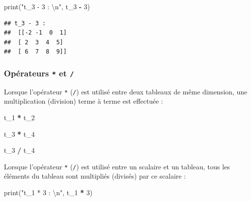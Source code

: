 \documentclass[12pt,]{book}
\newenvironment{Shaded}{\begin{snugshade}}{\end{snugshade}}
\newcommand{\DecValTok}[1]{\textcolor[rgb]{0.00,0.00,0.81}{#1}}
\newcommand{\CharTok}[1]{\textcolor[rgb]{0.31,0.60,0.02}{#1}}
\newcommand{\StringTok}[1]{\textcolor[rgb]{0.31,0.60,0.02}{#1}}
\newcommand{\OperatorTok}[1]{\textcolor[rgb]{0.81,0.36,0.00}{\textbf{#1}}}
\newcommand{\BuiltInTok}[1]{#1}
\newcommand{\NormalTok}[1]{#1}
\numberwithin{equation}{section}
\numberwithin{countremarque}{section}
\begin{document}
\begin{Shaded}
\begin{Highlighting}[]
\BuiltInTok{print}\NormalTok{(}\StringTok{"t_3 - 3 : }\CharTok{\textbackslash{}n}\StringTok{"}\NormalTok{, t_3 }\OperatorTok{-} \DecValTok{3}\NormalTok{)}
\end{Highlighting}
\end{Shaded}

\begin{lstlisting}
## t_3 - 3 : 
##  [[-2 -1  0  1]
##  [ 2  3  4  5]
##  [ 6  7  8  9]]
\end{lstlisting}

\subsubsection{\texorpdfstring{Opérateurs \texttt{*} et
\texttt{/}}{Opérateurs * et /}}\label{operateurs-et}

Lorsque l'opérateur \texttt{*} (\texttt{/}) est utilisé entre deux
tableaux de même dimension, une multiplication (division) terme à terme
est effectuée :

\begin{Shaded}
\begin{Highlighting}[]
\NormalTok{t_1 }\OperatorTok{*}\NormalTok{ t_2}
\end{Highlighting}
\end{Shaded}

\begin{Shaded}
\begin{Highlighting}[]
\NormalTok{t_3 }\OperatorTok{*}\NormalTok{ t_4}
\end{Highlighting}
\end{Shaded}

\begin{Shaded}
\begin{Highlighting}[]
\NormalTok{t_3 }\OperatorTok{/}\NormalTok{ t_4}
\end{Highlighting}
\end{Shaded}

Lorsque l'opérateur \texttt{*} (\texttt{/}) est utilisé entre un
scalaire et un tableau, tous les éléments du tableau sont multipliés
(divisés) par ce scalaire :

\begin{Shaded}
\begin{Highlighting}[]
\BuiltInTok{print}\NormalTok{(}\StringTok{"t_1 * 3 : }\CharTok{\textbackslash{}n}\StringTok{"}\NormalTok{, t_1 }\OperatorTok{*} \DecValTok{3}\NormalTok{)}
\end{Highlighting}
\end{Shaded}
\end{document}
